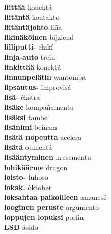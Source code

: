 \textbf{ liittää  } konektá \\
\textbf{ liitäntä  } kontakto \\
\textbf{ liitäntäjohto  } liña \\
\textbf{ likinäköinen  } bijziend \\
\textbf{ lilliputti-  } chikí \\
\textbf{ linja-auto  } trein \\
\textbf{ linkittää  } konektá \\
\textbf{ linnunpelätin  } wantomba \\
\textbf{ lipsautus-  } improvisá \\
\textbf{ lisä-  } èkstra \\
\textbf{ lisäke  } kompañamentu \\
\textbf{ lisäksi  } tambe \\
\textbf{ lisänimi  } beinam \\
\textbf{ lisätä nopeutta  } acelera \\
\textbf{ lisätä  } oumentá \\
\textbf{ lisääntyminen  } kresementu \\
\textbf{ lohikäärme  } dragon \\
\textbf{ loisto-  } luhoso \\
\textbf{ lokak.  } òktober \\
\textbf{ loksahtaa paikoilleen  } amanesé \\
\textbf{ looginen peruste  } argumento \\
\textbf{ loppujen lopuksi  } porfin \\
\textbf{ LSD  } ásido \\
